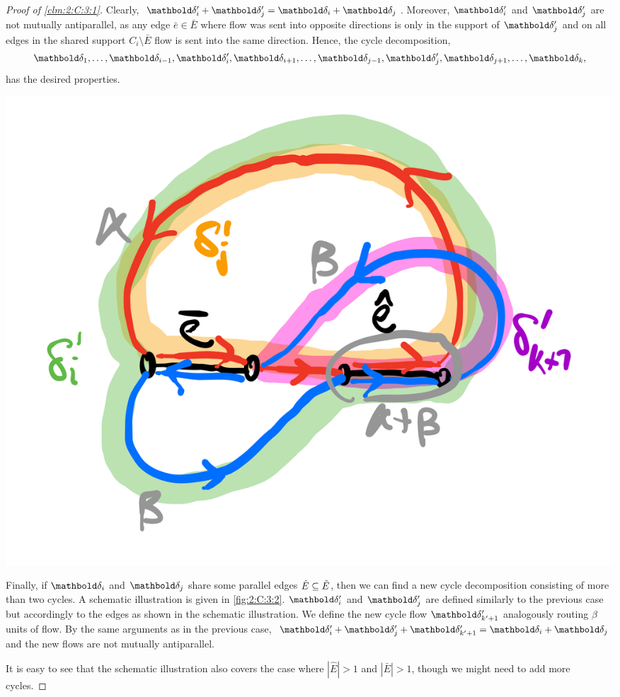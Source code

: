 \documentclass{tufte-handout}
\newcommand{\Etil}{\Tilde{E}}
\begin{document}
\begin{proof}[Proof of \cref{clm:2:C:3:1}]
Clearly, $\vdelta_i' + \vdelta_j' = \vdelta_i + \vdelta_j$. Moreover, $\vdelta_i'$ and $\vdelta_j'$ are not mutually antiparallel, as any edge $\bar{e} \in \bar{E}$ where flow was sent into opposite directions is only in the support of $\vdelta_j'$ and on all edges in the shared support $C_i \setminus \bar{E}$ flow is sent into the same direction. Hence, the cycle decomposition, \begin{align*}
    \vdelta_1, \dots, \vdelta_{i-1}, \vdelta_i', \vdelta_{i+1}, \dots, \vdelta_{j-1}, \vdelta_j', \vdelta_{j+1}, \dots, \vdelta_k,
\end{align*} has the desired properties.

\begin{marginfigure}[-3\baselineskip]
\includegraphics[width=\textwidth]{assignments/figures/cycle_decomposition2.png}
\caption{Schematic illustration of the cycle flow update when parallel edges are present. $\vdelta_i$ sends $\alpha$ units of flow and $\vdelta_j$ sends $\beta$ units of flow. The net flow on the edge $\bar{e}$ is $\alpha - \beta$ and the net flow on the edge $\hat{e}$ is $\alpha + \beta$.}\label{fig:2:C:3:2}
\end{marginfigure}

Finally, if $\vdelta_i$ and $\vdelta_j$ share some parallel edges $\hat{E} \subseteq \Etil$, then we can find a new cycle decomposition consisting of more than two cycles. A schematic illustration is given in \cref{fig:2:C:3:2}. $\vdelta_i'$ and $\vdelta_j'$ are defined similarly to the previous case but accordingly to the edges as shown in the schematic illustration. We define the new cycle flow $\vdelta_{k'+1}'$ analogously routing $\beta$ units of flow. By the same arguments as in the previous case, $\vdelta_i' + \vdelta_j' + \vdelta_{k'+1}' = \vdelta_i + \vdelta_j$ and the new flows are not mutually antiparallel.

It is easy to see that the schematic illustration also covers the case where $|\hat{E}| > 1$ and $|\bar{E}| > 1$, though we might need to add more cycles.
\end{proof}
\end{document}

